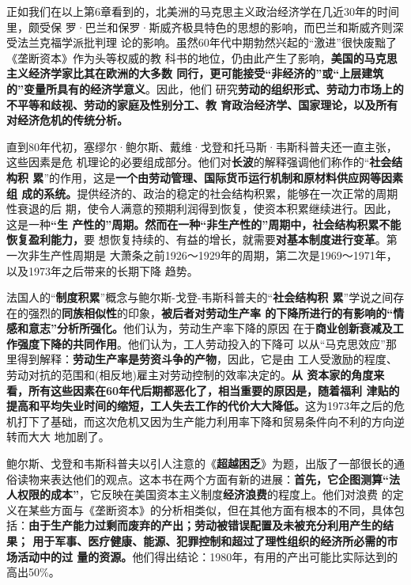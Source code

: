 正如我们在以上第6章看到的，北美洲的马克思主义政治经济学在几近30年的时间里，颇受保
罗·巴兰和保罗·斯威齐极具特色的思想的影响，而巴兰和斯威齐则深受法兰克福学派批判理
论的影响。虽然60年代中期勃然兴起的“激进”很快废黜了《垄断资本》作为头等权威的教
科书的地位，仍由此产生了影响，\textbf{美国的马克思主义经济学家比其在欧洲的大多数
  同行，更可能接受“非经济的”或“上层建筑的”变量所具有的经济学意义}。因此，他们
研究\textbf{劳动的组织形式、劳动力市场上的不平等和歧视、劳动的家庭及性别分工、教
  育政治经济学、国家理论，以及所有对经济危机的传统分析。}

直到80年代初，塞缪尔·鲍尔斯、戴维·戈登和托马斯·韦斯科普夫还一直主张，这些因素是危
机理论的必要组成部分。他们对\textbf{长波}的解释强调他们称作的“\textbf{社会结构积
  累}”的作用，这是\textbf{一个由劳动管理、国际货币运行机制和原材料供应网等因素组
  成的系统。}提供经济的、政治的稳定的社会结构积累，能够在一次正常的周期性衰退的后
期，使令人满意的预期利润得到恢复，使资本积累继续进行。因此，这是一种\textbf{“生
  产性的”周期。然而在一种“非生产性的”周期中，社会结构积累不能恢复盈利能力，}要
想恢复持续的、有益的增长，就需要\textbf{对基本制度进行变革}。第一次非生产性周期是
大萧条之前1926～1929年的周期，第二次是1969～1971年，以及1973年之后带来的长期下降
趋势。

法国人的“\textbf{制度积累}”概念与鲍尔斯-戈登-韦斯科普夫的“\textbf{社会结构积
  累}”学说之间存在的强烈的\textbf{同族相似性}的印象，\textbf{被后者对劳动生产率
  的下降所进行的有影响的“情感和意志”分析所强化。}他们认为，劳动生产率下降的原因
在于\textbf{商业创新衰减及工作强度下降的共同作用}。他们认为，工人劳动投入的下降可
以从“马克思效应”那里得到解释：\textbf{劳动生产率是劳资斗争的产物}，因此，它是由
工人受激励的程度、劳动对抗的范围和(相反地)雇主对劳动控制的效率决定的。\textbf{从
  资本家的角度来看，所有这些因素在60年代后期都恶化了，相当重要的原因是，随着福利
  津贴的提高和平均失业时间的缩短，工人失去工作的代价大大降低。}这为1973年之后的危
机打下了基础，而这次危机又因为生产能力利用率下降和贸易条件向不利的方向逆转而大大
地加剧了。

鲍尔斯、戈登和韦斯科普夫以引人注意的《\textbf{超越困乏}》为题，出版了一部很长的通
俗读物来表达他们的观点。这本书在两个方面有新的进展：\textbf{首先，它企图测算“法
  人权限的成本”}，它反映在美国资本主义制度\textbf{经济浪费}的程度上。他们对浪费
的定义在某些方面与《垄断资本》的分析相类似，但在其他方面有根本的不同，具体包
括：\textbf{由于生产能力过剩而废弃的产出；劳动被错误配置及未被充分利用产生的结果；
  用于军事、医疗健康、能源、犯罪控制和超过了理性组织的经济所必需的市场活动中的过
  量的资源。}他们得出结论：1980年，有用的产出可能比实际达到的高出50\%。

